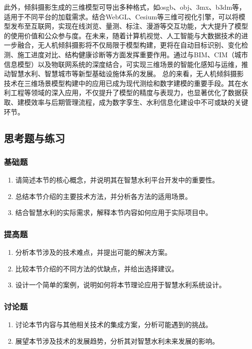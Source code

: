此外，倾斜摄影生成的三维模型可导出多种格式，如osgb、obj、3mx、b3dm等，适用于不同平台的加载需求。结合WebGL、Cesium等三维可视化引擎，可以将模型发布至互联网，实现在线浏览、量测、标注、漫游等交互功能，大大提升了模型的使用价值和公众参与度。在未来，随着计算机视觉、人工智能与大数据技术的进一步融合，无人机倾斜摄影将不仅局限于模型构建，更将在自动目标识别、变化检测、施工进度对比、结构健康诊断等方面发挥重要作用。通过与BIM、CIM（城市信息模型）以及物联网系统的深度结合，可实现三维场景的智能化感知与运维，推动智慧水利、智慧城市等新型基础设施体系的发展。 总的来看，无人机倾斜摄影技术在三维场景模型构建中的应用已成为现代测绘和数字建模的重要手段。其在水利工程等领域的深入应用，不仅提升了模型的精度与表现力，也显著优化了数据获取、建模效率与后期管理流程，成为数字孪生、水利信息化建设中不可或缺的关键环节。 \subsection{思考题与练习}\label{ux601dux8003ux9898ux4e0eux7ec3ux4e60} \subsubsection{基础题}\label{ux57faux7840ux9898} \begin{enumerate} \def\labelenumi{\arabic{enumi}.} \item 请简述本节的核心概念，并说明其在智慧水利平台开发中的重要性。 \item 总结本节介绍的主要技术方法，并分析各方法的适用场景。 \item 结合智慧水利的实际需求，解释本节内容如何应用于实际项目中。 \end{enumerate} \subsubsection{提高题}\label{ux63d0ux9ad8ux9898} \begin{enumerate} \def\labelenumi{\arabic{enumi}.} \setcounter{enumi}{3} \item 分析本节涉及的技术难点，并提出可能的解决方案。 \item 比较本节介绍的不同方法的优缺点，并给出选择建议。 \item 设计一个简单的案例，说明如何将本节理论应用于智慧水利系统设计。 \end{enumerate} \subsubsection{讨论题}\label{ux8ba8ux8bbaux9898} \begin{enumerate} \def\labelenumi{\arabic{enumi}.} \setcounter{enumi}{6} \item 讨论本节内容与其他相关技术的集成方案，分析可能遇到的挑战。 \item 展望本节涉及技术的发展趋势，分析其对智慧水利未来发展的影响。 \end{enumerate} 